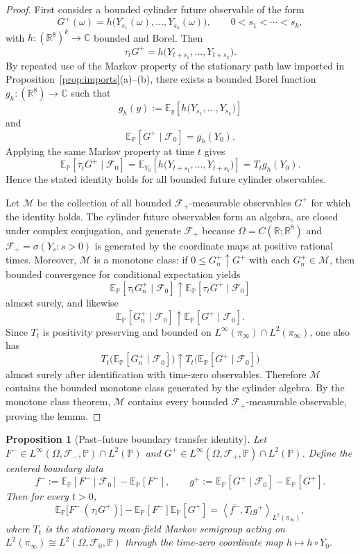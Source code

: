 \documentclass[11pt]{article}
\newtheorem{proposition}[theorem]{Proposition}
\theoremstyle{definition}
\theoremstyle{remark}
\newcommand{\R}{\mathbb R}
\newcommand{\C}{\mathbb C}
\newcommand{\E}{\mathbb E}
\newcommand{\mcF}{\mathcal F}
\begin{document}
\begin{proof}
First consider a bounded cylinder future observable of the form
\[
G^+(\omega)=h\bigl(Y_{s_1}(\omega),\dots,Y_{s_k}(\omega)\bigr),
\qquad
0<s_1<\cdots<s_k,
\]
with \(h:(\R^8)^k\to\C\) bounded and Borel.  Then
\[
\tau_t G^+
=
h\bigl(Y_{t+s_1},\dots,Y_{t+s_k}\bigr).
\]
By repeated use of the Markov property of the stationary path law imported in
Proposition~\ref{prop:imports}\textnormal{(a)--(b)}, there exists a bounded
Borel function \(g_h:(\R^8)\to\C\) such that
\[
g_h(y)
:=
\E_y\!\left[h\bigl(Y_{s_1},\dots,Y_{s_k}\bigr)\right]
\]
and
\[
\E_{\mathbb P}[G^+\mid\mcF_0]=g_h(Y_0).
\]
Applying the same Markov property at time \(t\) gives
\[
\E_{\mathbb P}[\tau_t G^+\mid\mcF_0]
=
\E_{Y_0}\!\left[h\bigl(Y_{t+s_1},\dots,Y_{t+s_k}\bigr)\right]
=
T_t g_h(Y_0).
\]
Hence the stated identity holds for all bounded future cylinder observables.

Let \(\mathcal M\) be the collection of all bounded \(\mcF_+\)-measurable
observables \(G^+\) for which the identity holds.  The cylinder future
observables form an algebra, are closed under complex conjugation, and generate
\(\mcF_+\) because \(\Omega=C(\R;\R^8)\) and \(\mcF_+=\sigma(Y_s:s>0)\) is
generated by the coordinate maps at positive rational times.  Moreover,
\(\mathcal M\) is a monotone class: if \(0\le G_n^+\uparrow G^+\) with each
\(G_n^+\in\mathcal M\), then bounded convergence for conditional expectation yields
\[
\E_{\mathbb P}[\tau_t G_n^+\mid\mcF_0]\uparrow
\E_{\mathbb P}[\tau_t G^+\mid\mcF_0]
\]
almost surely, and likewise
\[
\E_{\mathbb P}[G_n^+\mid\mcF_0]\uparrow
\E_{\mathbb P}[G^+\mid\mcF_0].
\]
Since \(T_t\) is positivity preserving and bounded on
\(L^\infty(\pi_\infty)\cap L^2(\pi_\infty)\), one also has
\[
T_t\!\bigl(\E_{\mathbb P}[G_n^+\mid\mcF_0]\bigr)\uparrow
T_t\!\bigl(\E_{\mathbb P}[G^+\mid\mcF_0]\bigr)
\]
almost surely after identification with time-zero observables.  Therefore
\(\mathcal M\) contains the bounded monotone class generated by the cylinder algebra.
By the monotone class theorem, \(\mathcal M\) contains every bounded
\(\mcF_+\)-measurable observable, proving the lemma.
\end{proof}

\begin{proposition}[Past--future boundary transfer identity]
\label{prop:transfer}
Let \(F^-\in L^\infty(\Omega,\mcF_-,\mathbb P)\cap L^2(\mathbb P)\) and
\(G^+\in L^\infty(\Omega,\mcF_+,\mathbb P)\cap L^2(\mathbb P)\).  Define the
centered boundary data
\[
f^-:=\E_{\mathbb P}[F^-\mid \mcF_0]-\E_{\mathbb P}[F^-],
\qquad
g^+:=\E_{\mathbb P}[G^+\mid \mcF_0]-\E_{\mathbb P}[G^+].
\]
Then for every \(t>0\),
\[
\E_{\mathbb P}\!\bigl[F^-\,(\tau_t G^+)\bigr]
-\E_{\mathbb P}[F^-]\E_{\mathbb P}[G^+]
=
\left\langle \overline{f^-},T_t g^+\right\rangle_{L^2(\pi_\infty)},
\]
where \(T_t\) is the stationary mean-field Markov semigroup acting on
\(L^2(\pi_\infty)\cong L^2(\Omega,\mcF_0,\mathbb P)\) through the time-zero
coordinate map \(h\mapsto h\circ Y_0\).
\end{proposition}
\end{document}
